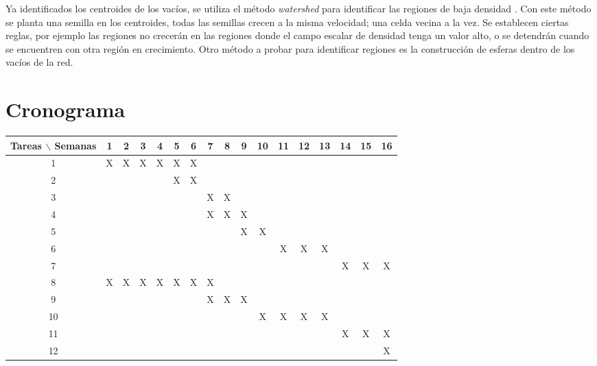 \documentclass[preprint]{aastex62}
\begin{document}
  Ya identificados los centroides de los vacíos, se utiliza el método \textit{watershed}
  para identificar las regiones de baja densidad \citep{Sutter2015}. Con este método
  se planta una semilla en los centroides, todas las semillas crecen a la misma velocidad; una
  celda vecina a la vez. Se establecen ciertas reglas, por ejemplo las regiones no crecerán en
  las regiones donde el campo escalar de densidad tenga un valor alto, o se detendrán cuando
  se encuentren con otra región en crecimiento. Otro método a probar para identificar regiones
  es la construcción de esferas dentro de los vacíos de la red. 

  \section{Cronograma}

  \begin{table}[htb]
    \begin{tabular}{|c|cccccccccccccccc| }
      \hline
      Tareas $\backslash$ Semanas & 1 & 2 & 3 & 4 & 5 & 6 & 7 & 8 & 9 & 10 & 11 & 12 & 13 & 14 & 15 & 16  \\
      \hline
      1 & X & X & X & X & X & X &   &   &   &   &   &   &   &   &   &   \\
      2 &   &   &   &   & X & X &   &   &   &   &   &   &   &   &   &   \\
      3 &   &   &   &   &   &   & X & X &   &   &   &   &   &   &   &   \\
      4 &   &   &   &   &   &   & X & X & X &   &   &   &   &   &   &   \\
      5 &   &   &   &   &   &   &   &   & X & X &   &   &   &   &   &   \\
      6 &   &   &   &   &   &   &   &   &   &   & X & X & X &   &   &   \\
      7 &   &   &   &   &   &   &   &   &   &   &   &   &   & X & X & X \\
      8 & X & X & X & X & X & X & X &   &   &   &   &   &   &   &   &   \\
      9 &   &   &   &   &   &   & X & X & X &   &   &   &   &   &   &   \\
      10&   &   &   &   &   &   &   &   &   & X & X & X & X &   &   &   \\
      11&   &   &   &   &   &   &   &   &   &   &   &   &   & X & X & X \\
      12&   &   &   &   &   &   &   &   &   &   &   &   &   &   &   & X \\
      \hline
    \end{tabular}
  \end{table}
\end{document}

